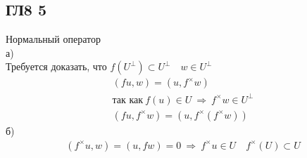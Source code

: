 \subsection*{ГЛ8 5}
Нормальный оператор\\
а)\\
Требуется доказать, что $f(U^{\perp}) \subset U^{\perp}\quad w \in U^{\perp}$
\begin{gather*}
	(fu, w) = (u, f^{\times}w)\\
	\text{так как}\ f(u) \in U\ \Rightarrow\ f^{\times}w \in U^{\perp}\\
	(fu, f^{\times}w) = (u, f^{\times}(f^{\times}w))
\end{gather*}
б)
\begin{gather*}
	(f^{\times}u, w) = (u, fw) = 0\ \Rightarrow\ f^{\times}u \in U\quad f^{\times}(U) \subset U
\end{gather*}